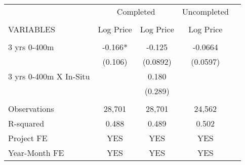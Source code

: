 \begin{tabular}{lcccc}
& \multicolumn{2}{c}{Completed} & Uncompleted \\
 &   &    &  \\
VARIABLES & Log Price & Log Price  &  Log Price  \\ \hline
   & & &   \\
3 yrs 0-400m & -0.166* & -0.125 &  -0.0664  \\
 & (0.106)  & (0.0892) &  (0.0597) \\
3 yrs 0-400m X In-Situ & & 0.180 &   \\
 &  & (0.289)  &  \\
 &  &  &   \\
Observations & 28,701 & 28,701 &  24,562 \\
R-squared & 0.488 &  0.489 &  0.502 \\
Project FE & YES & YES & YES \\
 Year-Month FE & YES & YES & YES \\ \hline
\end{tabular}
